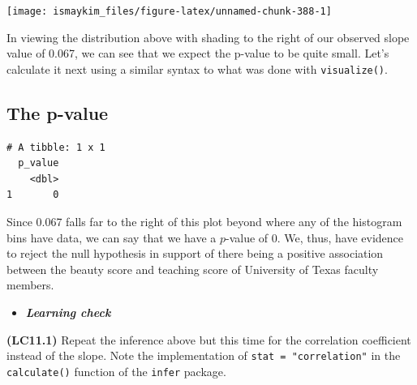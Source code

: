 \documentclass[12pt, krantz2,]{krantz}
\makeatletter
\newenvironment{Shaded}{\begin{snugshade}}{\end{snugshade}}
\newcommand{\DataTypeTok}[1]{\textcolor[rgb]{0.27,0.27,0.27}{#1}}
\newcommand{\KeywordTok}[1]{\textcolor[rgb]{0.27,0.27,0.27}{\textbf{#1}}}
\newcommand{\NormalTok}[1]{#1}
\newcommand{\OperatorTok}[1]{\textcolor[rgb]{0.43,0.43,0.43}{\textbf{#1}}}
\newcommand{\StringTok}[1]{\textcolor[rgb]{0.5,0.5,0.5}{#1}}
\newenvironment{kframe}{%
\medskip{}
\setlength{\fboxsep}{.8em}
 \def\at@end@of@kframe{}%
 \ifinner\ifhmode%
  \def\at@end@of@kframe{\end{minipage}}%
  \begin{minipage}{\columnwidth}%
 \fi\fi%
 \def\FrameCommand##1{\hskip\@totalleftmargin \hskip-\fboxsep
 \colorbox{shadecolor}{##1}\hskip-\fboxsep
     \hskip-\linewidth \hskip-\@totalleftmargin \hskip\columnwidth}%
 \MakeFramed {\advance\hsize-\width
   \@totalleftmargin\z@ \linewidth\hsize
   \@setminipage}}%
 {\par\unskip\endMakeFramed%
 \at@end@of@kframe}
\renewenvironment{Shaded}{\begin{kframe}}{\end{kframe}}
\newenvironment{rmdblock}[1]
  {\begin{shaded*}
  \begin{itemize}
  \renewcommand{\labelitemi}{
    \raisebox{-.7\height}[0pt][0pt]{
    }
  }
  \item
  }
  {
  \end{itemize}
  \end{shaded*}
  }
\newenvironment{learncheck}
  {\begin{rmdblock}{warning}}
  {\end{rmdblock}}
\makeatother
\begin{document}
\begin{Shaded}
\end{Shaded}

\begin{center}\texttt{[image: ismaykim\_files/figure-latex/unnamed-chunk-388-1]} \end{center}

In viewing the distribution above with shading to the right of our observed slope value of 0.067, we can see that we expect the p-value to be quite small. Let's calculate it next using a similar syntax to what was done with \texttt{visualize()}.

\hypertarget{the-p-value-1}{%
\subsection{The p-value}\label{the-p-value-1}}

\begin{Shaded}
\end{Shaded}

\begin{verbatim}
# A tibble: 1 x 1
  p_value
    <dbl>
1       0
\end{verbatim}

Since 0.067 falls far to the right of this plot beyond where any of the histogram bins have data, we can say that we have a \(p\)-value of 0. We, thus, have evidence to reject the null hypothesis in support of there being a positive association between the beauty score and teaching score of University of Texas faculty members.

\begin{learncheck}
\textbf{\emph{Learning check}}
\end{learncheck}

\textbf{(LC11.1)} Repeat the inference above but this time for the correlation coefficient instead of the slope. Note the implementation of \texttt{stat\ =\ "correlation"} in the \texttt{calculate()} function of the \texttt{infer} package.
\end{document}
